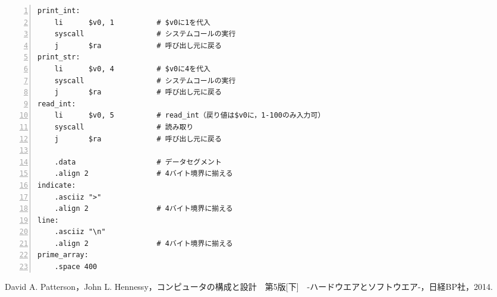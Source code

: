 \begin{Verbatim}[numbers=left, xleftmargin=10mm, numbersep=6pt,
                    fontsize=\small, baselinestretch=0.8]
print_int:
    li      $v0, 1          # $v0に1を代入
    syscall                 # システムコールの実行
    j       $ra             # 呼び出し元に戻る
print_str:
    li      $v0, 4          # $v0に4を代入
    syscall                 # システムコールの実行
    j       $ra             # 呼び出し元に戻る
read_int:
    li      $v0, 5          # read_int（戻り値は$v0に，1-100のみ入力可）
    syscall                 # 読み取り
    j       $ra             # 呼び出し元に戻る

    .data                   # データセグメント
    .align 2                # 4バイト境界に揃える
indicate:
    .asciiz ">"
    .align 2                # 4バイト境界に揃える
line:
    .asciiz "\n"
    .align 2                # 4バイト境界に揃える
prime_array:
    .space 400
\end{Verbatim}

\begin{thebibliography}{99}
   David A. Patterson，John L. Hennessy，コンピュータの構成と設計　第5版[下]　-ハードウエアとソフトウエア-，日経BP社，2014.
\end{thebibliography}


